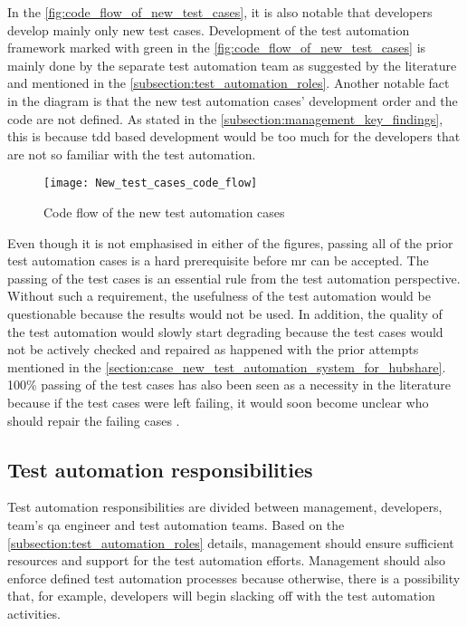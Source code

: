 In the \autoref{fig:code_flow_of_new_test_cases}, it is also notable that developers develop mainly only new test cases. Development of the test automation framework marked with green in the \autoref{fig:code_flow_of_new_test_cases} is mainly done by the separate test automation team as suggested by the literature and mentioned in the \autoref{subsection:test_automation_roles}. Another notable fact in the diagram is that the new test automation cases' development order and the code are not defined. As stated in the \autoref{subsection:management_key_findings}, this is because \gls{tdd} based development would be too much for the developers that are not so familiar with the test automation.

\begin{figure}
	\centering
	\texttt{[image: New\_test\_cases\_code\_flow]}
	\caption{Code flow of the new test automation cases}
	\label{fig:code_flow_of_new_test_cases}
\end{figure}

Even though it is not emphasised in either of the figures, passing all of the prior test automation cases is a hard prerequisite before \gls{mr} can be accepted. The passing of the test cases is an essential rule from the test automation perspective. Without such a requirement, the usefulness of the test automation would be questionable because the results would not be used. In addition, the quality of the test automation would slowly start degrading because the test cases would not be actively checked and repaired as happened with the prior attempts mentioned in the \autoref{section:case_new_test_automation_system_for_hubshare}. 100\% passing of the test cases has also been seen as a necessity in the literature because if the test cases were left failing, it would soon become unclear who should repair the failing cases \cite{beck2000extreme}.
\FloatBarrier

\subsection{Test automation responsibilities}
Test automation responsibilities are divided between management, developers, team's \gls{qa} engineer and test automation teams. Based on the \autoref{subsection:test_automation_roles} details, management should ensure sufficient resources and support for the test automation efforts. Management should also enforce defined test automation processes because otherwise, there is a possibility that, for example, developers will begin slacking off with the test automation activities.

